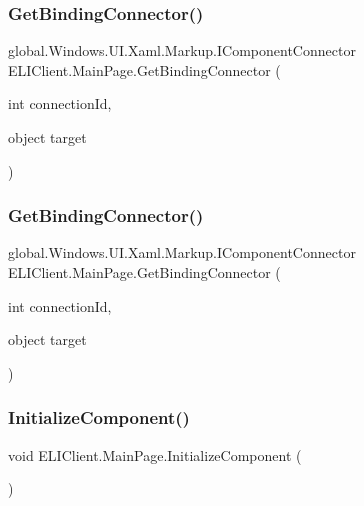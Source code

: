 \subsubsection{\texorpdfstring{Get\+Binding\+Connector()}{GetBindingConnector()}\hspace{0.1cm}{\footnotesize\ttfamily [2/3]}}
{\footnotesize\ttfamily global.\+Windows.\+U\+I.\+Xaml.\+Markup.\+I\+Component\+Connector E\+L\+I\+Client.\+Main\+Page.\+Get\+Binding\+Connector (\begin{DoxyParamCaption}\item[{int}]{connection\+Id,  }\item[{object}]{target }\end{DoxyParamCaption})\hspace{0.3cm}{\ttfamily [inline]}}

\mbox{\label{class_e_l_i_client_1_1_main_page_a9d43e9315d46dfb8b65575540e3d939b}} 
\subsubsection{\texorpdfstring{Get\+Binding\+Connector()}{GetBindingConnector()}\hspace{0.1cm}{\footnotesize\ttfamily [3/3]}}
{\footnotesize\ttfamily global.\+Windows.\+U\+I.\+Xaml.\+Markup.\+I\+Component\+Connector E\+L\+I\+Client.\+Main\+Page.\+Get\+Binding\+Connector (\begin{DoxyParamCaption}\item[{int}]{connection\+Id,  }\item[{object}]{target }\end{DoxyParamCaption})\hspace{0.3cm}{\ttfamily [inline]}}

\mbox{\label{class_e_l_i_client_1_1_main_page_a337e38b87a30d8d30bcc2a9164f0ac41}} 
\subsubsection{\texorpdfstring{Initialize\+Component()}{InitializeComponent()}\hspace{0.1cm}{\footnotesize\ttfamily [1/3]}}
{\footnotesize\ttfamily void E\+L\+I\+Client.\+Main\+Page.\+Initialize\+Component (\begin{DoxyParamCaption}{ }\end{DoxyParamCaption})\hspace{0.3cm}{\ttfamily [inline]}}



